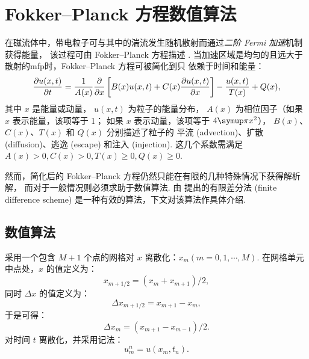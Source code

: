 
\chapter{Fokker--Planck 方程数值算法}
\label{chap:fpsolver}

在磁流体中，带电粒子可与其中的湍流发生随机散射而通过\emph{二阶 Fermi 加速}机制
获得能量\cite{fermi1949,fermi1954,davis1956}，
该过程可由 Fokker--Planck 方程描述
\cite{schlickeiser1989,eilek1991,schlickeiser2002}.
当加速区域是均匀的且远大于散射的\ac{mfp}时，Fokker--Planck 方程可被简化到只
依赖于时间和能量\cite{park1995,park1996}：
\begin{equation}
  \label{eq:fp-generic}
  \frac{\partial u(x,t)}{\partial t} = \frac{1}{A(x)} \frac{\partial }{\partial x}
    \left[ B(x) u(x,t) + C(x) \frac{\partial u(x,t)}{\partial x} \right]
    - \frac{u(x,t)}{T(x)} + Q(x) ,
\end{equation}
其中
$x$ 是能量或动量，
$u(x,t)$ 为粒子的能量分布，
$A(x)$ 为相位因子（如果 $x$ 表示能量，该项等于 1；
如果 $x$ 表示动量，该项等于 $4\Cpi x^2$），
$B(x)$、$C(x)$、$T(x)$ 和 $Q(x)$ 分别描述了粒子的
平流 (advection)、扩散 (diffusion)、逃逸 (escape) 和注入 (injection).
这几个系数需满足 $A(x) > 0, C(x) > 0, T(x) \ge 0, Q(x) \ge 0$.

然而，简化后的 Fokker--Planck 方程仍然只能在有限的几种特殊情况下获得解析解，
而对于一般情况则必须求助于数值算法.
由  提出的有限差分法 (finite difference scheme)
是一种有效的算法，下文对该算法作具体介绍.


\section{数值算法}

采用一个包含 $M+1$ 个点的网格对 $x$ 离散化：$x_m (m = 0, 1, \cdots, M)$.
在网格单元中点处，$x$ 的值定义为：
\begin{equation}
  \label{eq:x-mid}
  x_{m+1/2} = (x_m + x_{m+1}) / 2 ,
\end{equation}
同时 $\Delta x$ 的值定义为：
\begin{equation}
  \label{eq:dx-mid}
  \Delta x_{m+1/2} = x_{m+1} - x_m ,
\end{equation}
于是可得：
\begin{equation}
  \label{eq:dx}
  \Delta x_m = (x_{m+1} - x_{m-1}) / 2 .
\end{equation}
对时间 $t$ 离散化，并采用记法：
\begin{equation}
  \label{eq:u-t}
  u_m^n = u(x_m, t_n) .
\end{equation}

